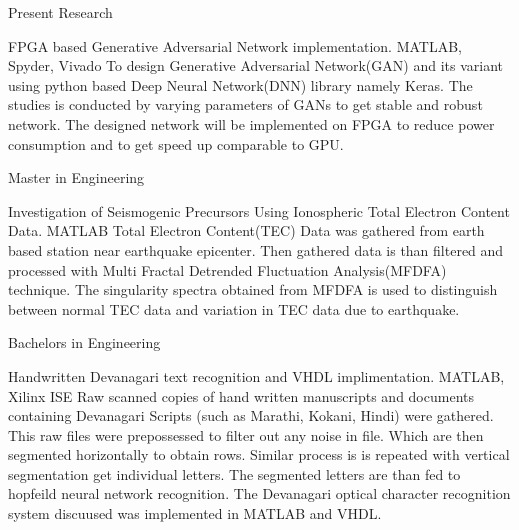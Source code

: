 \documentclass[fontsize=11pt]{tccv}
\begin{document}
\begin{fromto}
	\item{Present Research}
\end{fromto}
\begin{project}
	\item{FPGA based Generative Adversarial Network implementation.}
	{MATLAB, Spyder, Vivado}
	{To design Generative Adversarial Network(GAN) and its variant using python based Deep Neural Network(DNN) library namely Keras. The studies is conducted by varying parameters of GANs to get stable and robust network. The designed network will be implemented on  FPGA  to reduce power consumption and to get speed up comparable to GPU.  }\\
\end{project}
\vspace{2em}

\begin{fromto}
	\item{Master in Engineering}
\end{fromto}
\begin{project}
	\item{Investigation of Seismogenic Precursors Using Ionospheric Total Electron Content Data.}
	{MATLAB}
	{Total Electron Content(TEC) Data was gathered from earth based station near earthquake epicenter. Then gathered data is than filtered and processed with Multi Fractal Detrended Fluctuation Analysis(MFDFA) technique. The singularity spectra obtained from MFDFA is used to distinguish between normal TEC data and variation in TEC data due to earthquake.}\\
\end{project}
\vspace{2em}

\vspace{1em}
\begin{fromto}
	\item{Bachelors in Engineering}
\end{fromto}
\begin{project}
	\item{ Handwritten Devanagari text recognition and VHDL implimentation.}
	{MATLAB, Xilinx ISE}
	{Raw scanned copies of hand written manuscripts and documents containing Devanagari Scripts (such as Marathi, Kokani, Hindi) were gathered. This raw files were prepossessed to filter out any noise in file. Which are then segmented horizontally to obtain rows. Similar process is is repeated with vertical segmentation get individual letters. The segmented letters are than fed to hopfeild neural network recognition. The Devanagari optical character recognition system discuused was  implemented in MATLAB and VHDL.}\\
\end{project}	
\vspace{1em}
\end{document}
